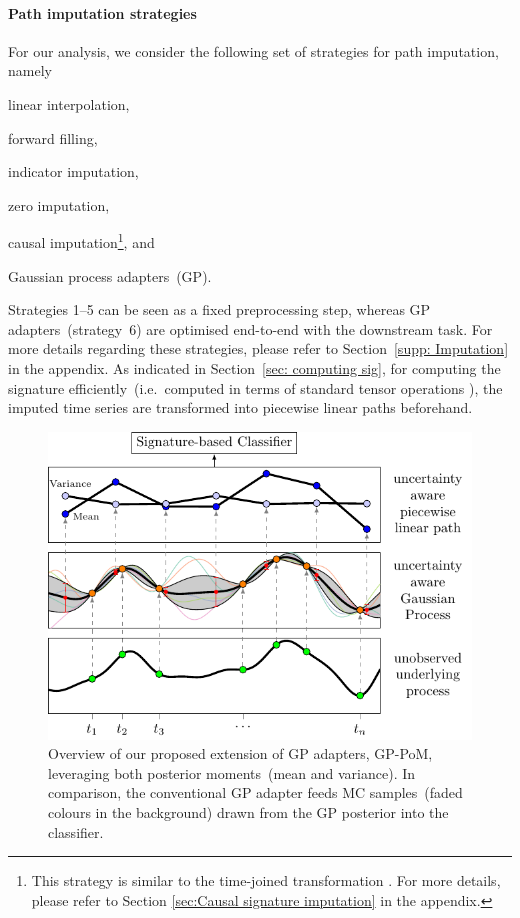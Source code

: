 \documentclass{article}
\begin{document}
\paragraph{Path imputation strategies}
For our analysis, we consider the following set of strategies for path imputation, namely
\begin{inparaenum}[(1)]
    \item linear interpolation,
    \item forward filling,
    \item indicator imputation,
    \item zero imputation,
    \item causal imputation\footnote{This strategy is similar to the
      time-joined transformation \citep{levin2013}. For more details,
    please refer to Section \ref{sec:Causal signature imputation} in the
  appendix.}, and
    \item Gaussian process adapters~(GP).
\end{inparaenum}
%
Strategies 1--5 can be seen as a fixed preprocessing step, whereas GP
adapters~(strategy~6) are optimised end-to-end with the downstream task. For more
details regarding these strategies, please refer to Section~\ref{supp: Imputation} in the appendix. As indicated in Section~\ref{sec: computing sig}, for computing the signature efficiently~(i.e.\ computed in terms of standard tensor operations \citep[Proposition A.3]{kidger2019deep}), the imputed time series are transformed into piecewise linear paths beforehand.

\begin{figure}[t]
    \centering
    \hspace*{1cm}
    \includegraphics[width=0.7\columnwidth]{figures/overview.pdf}
    \caption{%
      Overview of our proposed extension of GP adapters, GP-PoM,
      leveraging both posterior moments~(mean and variance). In
      comparison, the conventional GP adapter feeds MC samples~(faded
      colours in the background) drawn from the GP posterior into the
      classifier.
    }
    \label{fig:overview}
\end{figure}
\end{document}
